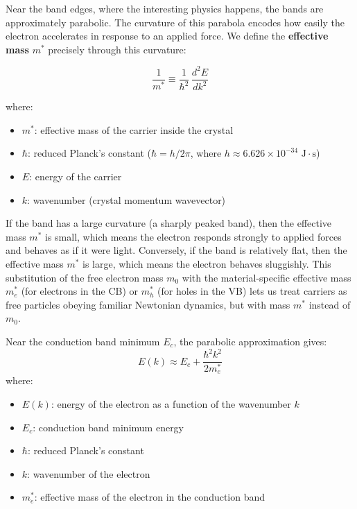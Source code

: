 Near the band edges, where the interesting physics happens, the bands are approximately parabolic. The curvature of this parabola encodes how easily the electron accelerates in response to an applied force. We define the \textbf{effective mass} $m^*$ precisely through this curvature:
\begin{keyresult}
    \begin{equation}
        \frac{1}{m^*} \equiv \frac{1}{\hbar^2}\,\frac{d^2 E}{dk^2}
    \end{equation}
\end{keyresult}
where:
\begin{itemize}
    \item $m^*$: effective mass of the carrier inside the crystal
    \item $\hbar$: reduced Planck's constant ($\hbar = h/2\pi$, where $h \approx 6.626 \times 10^{-34}\text{ J}\cdot\text{s}$)
    \item $E$: energy of the carrier
    \item $k$: wavenumber (crystal momentum wavevector)
\end{itemize}

If the band has a large curvature (a sharply peaked band), then the effective mass $m^*$ is small, which means the electron responds strongly to applied forces and behaves as if it were light. Conversely, if the band is relatively flat, then the effective mass $m^*$ is large, which means the electron behaves sluggishly. This substitution of the free electron mass $m_0$ with the material-specific effective mass $m^*_e$ (for electrons in the CB) or $m^*_h$ (for holes in the VB) lets us treat carriers as free particles obeying familiar Newtonian dynamics, but with mass $m^*$ instead of $m_0$.

Near the conduction band minimum $E_c$, the parabolic approximation gives:
\begin{equation*}
    E(k) \approx E_c + \frac{\hbar^2 k^2}{2 m^*_e}
\end{equation*}
where:
\begin{itemize}
    \item $E(k)$: energy of the electron as a function of the wavenumber $k$
    \item $E_c$: conduction band minimum energy
    \item $\hbar$: reduced Planck's constant
    \item $k$: wavenumber of the electron
    \item $m^*_e$: effective mass of the electron in the conduction band
\end{itemize}


